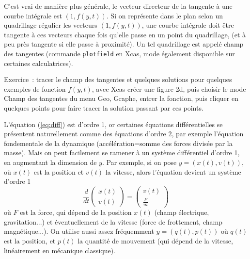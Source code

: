 \documentclass[a4paper,11pt]{article}
\begin{document}
\begin{giacjshere}
C'est vrai de mani\`ere plus g\'en\'erale, le vecteur directeur
de la tangente \`a une courbe int\'egrale est $(1,f(y,t))$. Si
on repr\'esente dans le plan selon un quadrillage r\'egulier
les vecteurs $(1,f(y,t))$, une courbe int\'egrale doit \^etre
tangente \`a ces vecteurs chaque fois qu'elle passe en un point
du quadrillage, (et \`a peu pr\`es tangente si elle passe \`a
proximit\'e). Un tel quadrillage est appel\'e champ des tangentes
(commande \verb|plotfield| en Xcas, mode \'egalement disponible
sur certaines calculatrices).

Exercice~: tracer le champ des tangentes et quelques solutions
pour quelques exemples de fonction $f(y,t)$, avec Xcas cr\'eer
une figure 2d, puis choisir le mode Champ des tangentes
du menu Geo, Graphe, entrer la fonction, puis cliquer en quelques
points pour faire tracer la solution passant par ces points.

L'\'equation (\ref{eq:diff}) est d'ordre 1, or certaines \'equations
diff\'erentielles se pr\'esentent naturellement comme des
\'equations d'ordre 2, par exemple l'\'equation fondementale
de la dynamique (acc\'el\'eration=somme des forces divis\'ee par
la masse). Mais on peut facilement se ramener \`a un
syst\`eme diff\'erentiel d'ordre
1, en augmentant la dimension de $y$. Par exemple, si
on pose $y=(x(t),v(t))$, o\`u $x(t)$ est la position
et $v(t)$ la vitesse, alors l'\'equation devient un syst\`eme d'ordre 1
$$ \frac{d}{dt} \left(\begin{array}{c} x(t) \\ v(t) \end{array}
\right) 
= \left(\begin{array}{c} v(t) \\ \frac{F}{m} \end{array} \right) $$
o\`u $F$ est la force, qui d\'epend de la position $x(t)$ 
(champ \'electrique, gravitation...) et
\'eventuellement de la vitesse (force de frottement, champ magn\'etique...).
On utilise aussi assez fr\'equemment $y=(q(t),p(t))$
o\`u $q(t)$ est la position, et $p(t)$ la quantit\'e de mouvement
(qui d\'epend de la vitesse, lin\'eairement en m\'ecanique classique).


\end{giacjshere}
\end{document}
